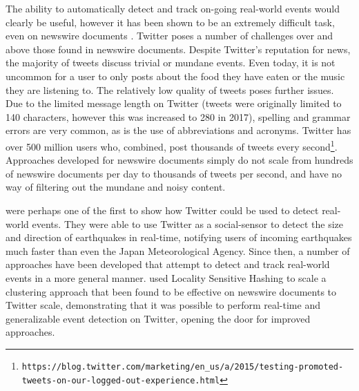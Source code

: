 The ability to automatically detect and track on-going real-world events would clearly be useful, however it has been shown to be an extremely difficult task, even on newswire documents \citep{Allan:2000:FSD:354756.354843}.
Twitter poses a number of challenges over and above those found in newswire documents.
Despite Twitter's reputation for news, the majority of tweets discuss trivial or mundane events.
Even today, it is not uncommon for a user to only posts about the food they have eaten or the music they are listening to.
The relatively low quality of tweets poses further issues.
Due to the limited message length on Twitter (tweets were originally limited to 140 characters, however this was increased to 280 in 2017), spelling and grammar errors are very common, as is the use of abbreviations and acronyms.
Twitter has over 500 million users who, combined, post thousands of tweets every second\footnote{\texttt{https://blog.twitter.com/marketing/en\_us/a/2015/testing-promoted-\\tweets-on-our-logged-out-experience.html}}.
Approaches developed for newswire documents simply do not scale from hundreds of newswire documents per day to thousands of tweets per second, and have no way of filtering out the mundane and noisy content.

\cite{Sakaki:2010:EST:1772690.1772777} were perhaps one of the first to show how Twitter could be used to detect real-world events.
They were able to use Twitter as a social-sensor to detect the size and direction of earthquakes in real-time, notifying users of incoming earthquakes much faster than even the Japan Meteorological Agency.
Since then, a number of approaches have been developed that attempt to detect and track real-world events in a more general manner.
\cite{Petrovic10} used Locality Sensitive Hashing to scale a clustering approach that been found to be effective on newswire documents to Twitter scale, demonstrating that it was possible to perform real-time and generalizable event detection on Twitter, opening the door for improved approaches.

